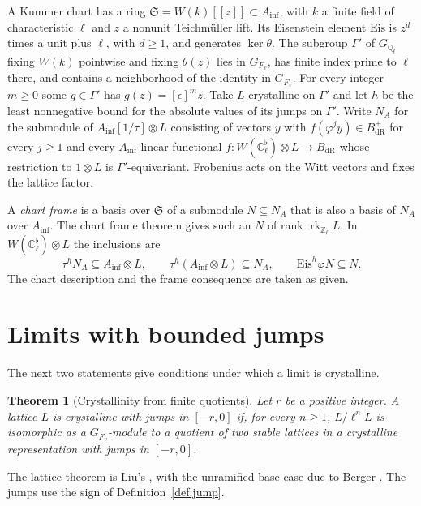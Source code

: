 \documentclass[reqno]{amsart}
\theoremstyle{definition}
\theoremstyle{plain}
\newtheorem{theorem}{Theorem}[section]
\theoremstyle{remark}
\newcommand{\Z}{\mathbb Z}
\newcommand{\Q}{\mathbb Q}
\newcommand{\C}{\mathbb C}
\newcommand{\Bdr}{B_{\mathrm{dR}}}
\newcommand{\Ainf}{A_{\mathrm{inf}}}
\newcommand{\rk}{\operatorname{rk}}
\newcommand{\Eis}{\mathrm{Eis}}
\begin{document}
A Kummer chart has a ring \(\mathfrak S=W(k)[[z]]\subset\Ainf\), with
\(k\) a finite field of characteristic \(\ell\) and \(z\) a nonunit
Teichm\"uller lift. Its Eisenstein element \(\Eis\) is \(z^d\) times a
unit plus \(\ell\), with \(d\ge 1\), and generates \(\ker\theta\).
The subgroup \(\Gamma'\) of \(G_{\Q_\ell}\) fixing \(W(k)\) pointwise and
fixing \(\theta(z)\) lies in \(G_{F_v}\), has finite index prime to \(\ell\)
there, and contains a neighborhood of the identity in \(G_{F_v}\).
For every integer \(m\ge 0\) some \(g\in\Gamma'\) has
\(g(z)=[\epsilon]^m z\). Take \(L\) crystalline on \(\Gamma'\) and let
\(h\) be the least nonnegative bound for the absolute values of its
jumps on \(\Gamma'\). Write \(N_A\) for the submodule of \(\Ainf[1/\tau]\otimes L\)
consisting of vectors \(y\) with \(f(\varphi^j y)\in \Bdr^+\) for every
\(j\ge 1\) and every \(\Ainf\)-linear functional
\(f\colon W(\C_\ell^\flat)\otimes L\to\Bdr\) whose restriction to
\(1\otimes L\) is \(\Gamma'\)-equivariant. Frobenius acts on the Witt
vectors and fixes the lattice factor.

A \emph{chart frame} is a basis over \(\mathfrak S\) of a submodule
\(N\subseteq N_A\) that is also a basis of \(N_A\) over \(\Ainf\).
The chart frame theorem \cite{GL} gives such an \(N\) of rank
\(\rk_{\Z_\ell}L\).
In \(W(\C_\ell^\flat)\otimes L\) the inclusions are
\[
 \tau^h N_A\subseteq \Ainf\otimes L,\qquad
 \tau^h(\Ainf\otimes L)\subseteq N_A,\qquad
 \Eis^h\varphi N\subseteq N .
\]
The chart description and the frame consequence are taken as given.

\section{Limits with bounded jumps}\label{sec:limits}

The next two statements give conditions under which a limit is crystalline.

\begin{theorem}[Crystallinity from finite quotients]\label{thm:limit}
Let \(r\) be a positive integer. A lattice \(L\) is crystalline with jumps in \([-r,0]\)
if, for every \(n\ge 1\), \(L/\ell^n L\) is isomorphic as a \(G_{F_v}\)-module
to a quotient of two stable lattices in a crystalline representation
with jumps in \([-r,0]\).
\end{theorem}

The lattice theorem is Liu's \cite{Liu}, with the unramified base case due
to Berger \cite{Be}. The jumps use the sign of Definition~\ref{def:jump}.
\end{document}

